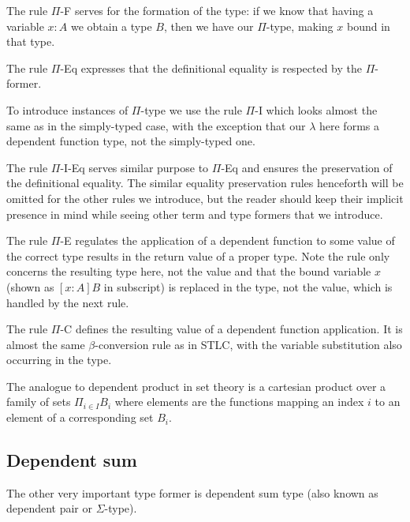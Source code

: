 The rule $\Pi$-F serves for the formation of the type: if we know that having a
variable $x: A$ we obtain a type $B$, then we have our $\Pi$-type, making $x$
bound in that type.

The rule $\Pi$-Eq expresses that the definitional equality is respected by the
$\Pi$-former.

To introduce instances of $\Pi$-type we use the rule $\Pi$-I which looks almost
the same as in the simply-typed case, with the exception that our $\lambda$
here forms a dependent function type, not the simply-typed one.

The rule $\Pi$-I-Eq serves similar purpose to $\Pi$-Eq and ensures the
preservation of the definitional equality. The similar equality preservation
rules henceforth will be omitted for the other rules we introduce, but the
reader should keep their implicit presence in mind while seeing other term and
type formers that we introduce.

The rule $\Pi$-E regulates the application of a dependent function to some value
of the correct type results in the return value of a proper type. Note the rule
only concerns the resulting type here, not the value and that the bound
variable $x$ (shown as $[x : A] B$ in subscript) is replaced in the type, not
the value, which is handled by the next rule.

The rule $\Pi$-C defines the resulting value of a dependent function
application. It is almost the same $\beta$-conversion rule as in STLC, with the
variable substitution also occurring in the type.

The analogue to dependent product in set theory is a cartesian product over a
family of sets $\Pi_{i \in I}B_i$ where elements are the functions mapping an
index $i$ to an element of a corresponding set $B_i$.

\subsection*{Dependent sum}

The other very important type former is dependent sum type (also known as
dependent pair or $\Sigma$-type).

